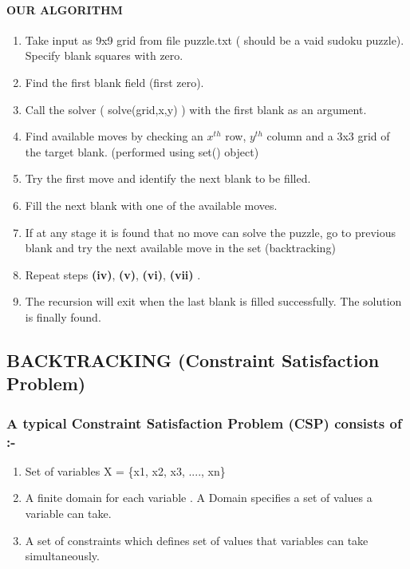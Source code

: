 \documentclass[11pt]{article}
\begin{document}
\paragraph{OUR ALGORITHM}
\begin{enumerate}[label=(\roman*)]
\item Take input as 9x9 grid from file puzzle.txt ( should be a vaid sudoku puzzle).\\
 Specify blank squares with zero.

\item Find the first blank field (first zero).
\item Call the solver ( solve(grid,x,y) ) with the first blank as an argument.
 \item Find available moves by checking an \(x^{th}\) row, \(y^{th}\) column and a 3x3 grid of the target blank. (performed using set() object)
\item Try the first move and identify the next blank to be filled.
\item Fill the next blank with one of the available moves.
\item If at any stage it is found that no move can solve the puzzle, go to previous blank and try the next available move in the set (backtracking)
\item Repeat steps \textbf{(iv)}, \textbf{(v)}, \textbf{(vi)}, \textbf{(vii)} .
\item The recursion will exit when the last blank is filled successfully. The solution is finally found.
\end{enumerate}
\subsection{ BACKTRACKING (Constraint Satisfaction Problem)}
\subsubsection{A typical Constraint Satisfaction Problem (CSP) consists of :-}
\begin{enumerate}[label=(\alph*)]
\item Set of variables  X = \{x1, x2, x3, ...., xn\}
\item A finite domain for each variable . A Domain specifies a set of values a variable can take.
\item A set of constraints which defines set of values that variables can take simultaneously.
\end{enumerate}
\end{document}
